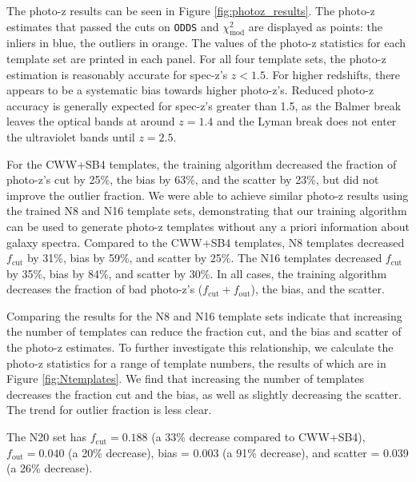 The photo-z results can be seen in Figure \ref{fig:photoz_results}.
The photo-z estimates that passed the cuts on \texttt{ODDS} and $\chi_\text{mod}^2$ are displayed as points: the inliers in blue, the outliers in orange.
The values of the photo-z statistics for each template set are printed in each panel.
For all four template sets, the photo-z estimation is reasonably accurate for spec-z's $z < 1.5$.
For higher redshifts, there appears to be a systematic bias towards higher photo-z's.
Reduced photo-z accuracy is generally expected for spec-z's greater than 1.5, as the Balmer break leaves the optical bands at around $z=1.4$ and the Lyman break does not enter the ultraviolet bands until $z=2.5$.

For the CWW+SB4 templates, the training algorithm decreased the fraction of photo-z's cut by 25\%, the bias by 63\%, and the scatter by 23\%, but did not improve the outlier fraction.
We were able to achieve similar photo-z results using the trained N8 and N16 template sets, demonstrating that our training algorithm can be used to generate photo-z templates without any a priori information about galaxy spectra.
Compared to the CWW+SB4 templates, N8 templates decreased $f_\text{cut}$ by 31\%, bias by 59\%, and scatter by 25\%.
The N16 templates decreased $f_\text{cut}$ by 35\%, bias by 84\%, and scatter by 30\%.
In all cases, the training algorithm decreases the fraction of bad photo-z's ($f_\text{cut} + f_\text{out}$), the bias, and the scatter.

Comparing the results for the N8 and N16 template sets indicate that increasing the number of templates can reduce the fraction cut, and the bias and scatter of the photo-z estimates.
To further investigate this relationship, we calculate the photo-z statistics for a range of template numbers, the results of which are in Figure \ref{fig:Ntemplates}.
We find that increasing the number of templates decreases the fraction cut and the bias, as well as slightly decreasing the scatter.
The trend for outlier fraction is less clear.

The N20 set has $f_\text{cut} = 0.188$ (a 33\% decrease compared to CWW+SB4), $f_\text{out} = 0.040$ (a 20\% decrease), bias = 0.003 (a 91\% decrease), and scatter = 0.039 (a 26\% decrease).


